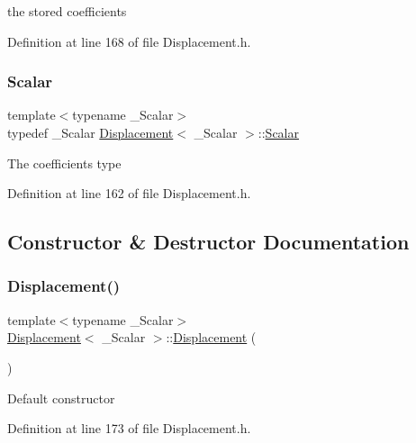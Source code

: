 the stored coefficients 

Definition at line 168 of file Displacement.\+h.

\hypertarget{class_displacement_ade979a89a65e3b67dea322a0cef92c88}{}\label{class_displacement_ade979a89a65e3b67dea322a0cef92c88} 
\subsubsection{\texorpdfstring{Scalar}{Scalar}}
{\footnotesize\ttfamily template$<$typename \+\_\+\+Scalar$>$ \\
typedef \+\_\+\+Scalar \hyperlink{class_displacement}{Displacement}$<$ \+\_\+\+Scalar $>$\+::\hyperlink{class_displacement_ade979a89a65e3b67dea322a0cef92c88}{Scalar}}

The coefficients type 

Definition at line 162 of file Displacement.\+h.



\subsection{Constructor \& Destructor Documentation}
\hypertarget{class_displacement_a78920473a1b63b88597d9cc0e749b908}{}\label{class_displacement_a78920473a1b63b88597d9cc0e749b908} 
\subsubsection{\texorpdfstring{Displacement()}{Displacement()}\hspace{0.1cm}{\footnotesize\ttfamily [1/7]}}
{\footnotesize\ttfamily template$<$typename \+\_\+\+Scalar$>$ \\
\hyperlink{class_displacement}{Displacement}$<$ \+\_\+\+Scalar $>$\+::\hyperlink{class_displacement}{Displacement} (\begin{DoxyParamCaption}{ }\end{DoxyParamCaption})\hspace{0.3cm}{\ttfamily [inline]}}

Default constructor 

Definition at line 173 of file Displacement.\+h.

\hypertarget{class_displacement_ac23802122cd27f1ba1f1eb70d71e5e09}{}\label{class_displacement_ac23802122cd27f1ba1f1eb70d71e5e09} 
